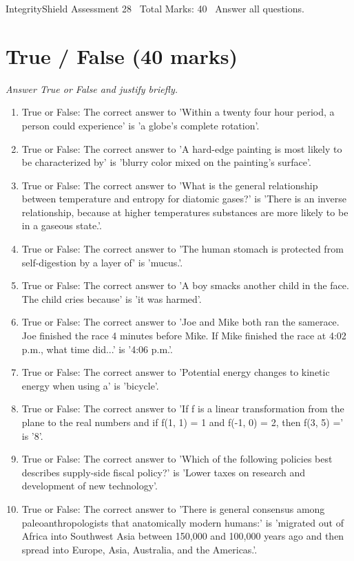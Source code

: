 \documentclass[12pt]{article}
\begin{document}
\begin{center}
IntegrityShield Assessment 28 \
Total Marks: 40 \
Answer all questions.
\end{center}

\section*{True / False (40 marks)}
\textit{Answer True or False and justify briefly.}
\begin{enumerate}[label=\arabic*.]
\item True or False: The correct answer to 'Within a twenty four hour period, a person could experience' is 'a globe's complete rotation'.
\item True or False: The correct answer to 'A hard-edge painting is most likely to be characterized by' is 'blurry color mixed on the painting's surface'.
\item True or False: The correct answer to 'What is the general relationship between temperature and entropy for diatomic gases?' is 'There is an inverse relationship, because at higher temperatures substances are more likely to be in a gaseous state.'.
\item True or False: The correct answer to 'The human stomach is protected from self-digestion by a layer of' is 'mucus.'.
\item True or False: The correct answer to 'A boy smacks another child in the face. The child cries because' is 'it was harmed'.
\item True or False: The correct answer to 'Joe and Mike both ran the samerace. Joe finished the race 4 minutes before Mike. If Mike finished the race at 4:02 p.m., what time did...' is '4:06 p.m.'.
\item True or False: The correct answer to 'Potential energy changes to kinetic energy when using a' is 'bicycle'.
\item True or False: The correct answer to 'If f is a linear transformation from the plane to the real numbers and if f(1, 1) = 1 and f(-1, 0) = 2, then f(3, 5) =' is '8'.
\item True or False: The correct answer to 'Which of the following policies best describes supply-side fiscal policy?' is 'Lower taxes on research and development of new technology'.
\item True or False: The correct answer to 'There is general consensus among paleoanthropologists that anatomically modern humans:' is 'migrated out of Africa into Southwest Asia between 150,000 and 100,000 years ago and then spread into Europe, Asia, Australia, and the Americas.'.

\end{enumerate}
\end{document}
